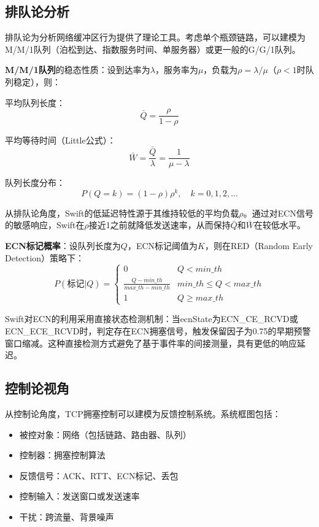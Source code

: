 \subsection{排队论分析}

排队论为分析网络缓冲区行为提供了理论工具。考虑单个瓶颈链路，可以建模为M/M/1队列（泊松到达、指数服务时间、单服务器）或更一般的G/G/1队列。

\textbf{M/M/1队列}的稳态性质：设到达率为$\lambda$，服务率为$\mu$，负载为$\rho = \lambda/\mu$（$\rho < 1$时队列稳定），则：

平均队列长度：
\begin{equation}
\bar{Q} = \frac{\rho}{1-\rho}
\end{equation}

平均等待时间（Little公式）：
\begin{equation}
\bar{W} = \frac{\bar{Q}}{\lambda} = \frac{1}{\mu - \lambda}
\end{equation}

队列长度分布：
\begin{equation}
P(Q = k) = (1-\rho)\rho^k, \quad k = 0, 1, 2, ...
\end{equation}

从排队论角度，Swift的低延迟特性源于其维持较低的平均负载$\rho$。通过对ECN信号的敏感响应，Swift在$\rho$接近1之前就降低发送速率，从而保持$\bar{Q}$和$\bar{W}$在较低水平。

\textbf{ECN标记概率}：设队列长度为$Q$，ECN标记阈值为$K$，则在RED（Random Early Detection）策略下：
\begin{equation}
P(\text{标记}|Q) = \begin{cases}
0 & Q < min\_th \\
\frac{Q - min\_th}{max\_th - min\_th} & min\_th \leq Q < max\_th \\
1 & Q \geq max\_th
\end{cases}
\end{equation}

Swift对ECN的利用采用直接状态检测机制：当ecnState为ECN\_CE\_RCVD或ECN\_ECE\_RCVD时，判定存在ECN拥塞信号，触发保留因子为0.75的早期预警窗口缩减。这种直接检测方式避免了基于事件率的间接测量，具有更低的响应延迟。

\subsection{控制论视角}

从控制论角度，TCP拥塞控制可以建模为反馈控制系统。系统框图包括：
\begin{itemize}
    \item 被控对象：网络（包括链路、路由器、队列）
    \item 控制器：拥塞控制算法
    \item 反馈信号：ACK、RTT、ECN标记、丢包
    \item 控制输入：发送窗口或发送速率
    \item 干扰：跨流量、背景噪声
\end{itemize}

